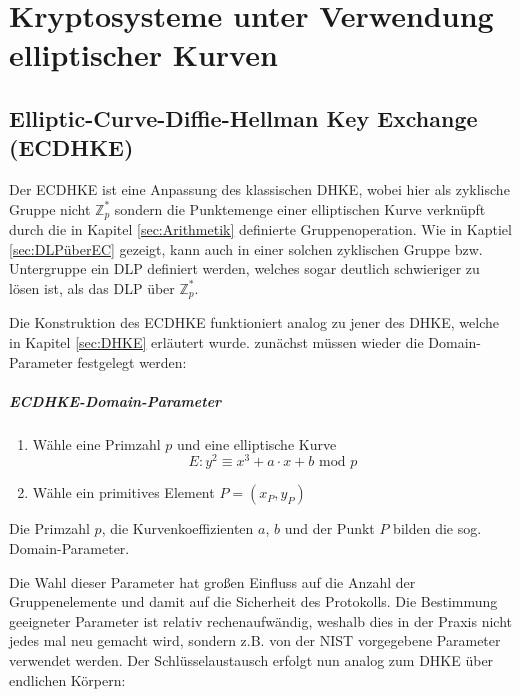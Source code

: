 \chapter{Kryptosysteme unter Verwendung elliptischer Kurven}
\section{Elliptic-Curve-Diffie-Hellman Key Exchange (ECDHKE)}
Der ECDHKE ist eine Anpassung des klassischen DHKE, wobei hier als zyklische Gruppe nicht $\mathbb{Z}_p^*$ sondern die Punktemenge einer elliptischen Kurve verknüpft durch die in Kapitel \ref{sec:Arithmetik} definierte Gruppenoperation. Wie in Kaptiel \ref{sec:DLPüberEC} gezeigt, kann auch in einer solchen zyklischen Gruppe bzw. Untergruppe ein DLP definiert werden, welches sogar deutlich schwieriger zu lösen ist, als das DLP über $\mathbb{Z}_p^*$.

Die Konstruktion des ECDHKE funktioniert analog zu jener des DHKE, welche in Kapitel \ref{sec:DHKE} erläutert wurde. zunächst müssen wieder die Domain-Parameter festgelegt werden:

\paragraph{ECDHKE-Domain-Parameter}
\begin{enumerate}
\item Wähle eine Primzahl $p$ und eine elliptische Kurve $$E: y^2 \equiv x^3 + a \cdot x +b \text{ mod } p$$
\item Wähle ein primitives Element $P = (x_P, y_P)$
\end{enumerate}
Die Primzahl $p$, die Kurvenkoeffizienten $a$, $b$ und der Punkt $P$ bilden die sog. Domain-Parameter.

Die Wahl dieser Parameter hat großen Einfluss auf die Anzahl der Gruppenelemente und damit auf die Sicherheit des Protokolls. Die Bestimmung geeigneter Parameter ist relativ rechenaufwändig, weshalb dies in der Praxis nicht jedes mal neu gemacht wird, sondern z.B. von der NIST vorgegebene Parameter verwendet werden. Der Schlüsselaustausch erfolgt nun analog zum DHKE über endlichen Körpern:

